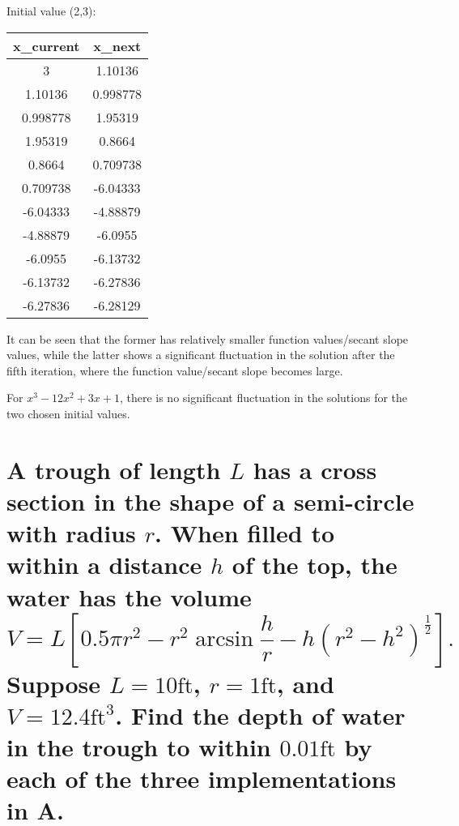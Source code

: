 \documentclass[a4paper]{article}
\begin{document}
\begin{center}
Initial value (2,3):\\
\begin{tabular}{|c|c|}
  \hline
  \textbf{x\_current} & \textbf{x\_next} \\
  \hline
  3 & 1.10136 \\
  \hline
  1.10136 & 0.998778 \\
  \hline
  0.998778 & 1.95319 \\
  \hline
  1.95319 & 0.8664 \\
  \hline
  0.8664 & 0.709738 \\
  \hline
  0.709738 & -6.04333 \\
  \hline
  -6.04333 & -4.88879 \\
  \hline
  -4.88879 & -6.0955 \\
  \hline
  -6.0955 & -6.13732 \\
  \hline
  -6.13732 & -6.27836 \\
  \hline
  -6.27836 & -6.28129 \\
  \hline
\end{tabular}
\end{center}
It can be seen that the former has relatively smaller function values/secant slope values, while the latter shows a significant fluctuation in the solution after the fifth iteration, where the function value/secant slope becomes large.

For $x^3 - 12x^2 + 3x + 1$, there is no significant fluctuation in the solutions for the two chosen initial values.


\section*{A trough of length $L$ has a cross section in the shape of a semi-circle with radius $r$. When filled to within a distance $h$ of the top, the water has the volume
\[
V = L\left[0.5\pi r^{2} - r^{2}\arcsin\frac{h}{r} - h\left(r^{2} - h^{2}\right)^{\frac{1}{2}}\right].
\]
Suppose $L = 10 \text{ft}$, $r = 1 \text{ft}$, and $V = 12.4 \text{ft}^3$. Find the depth of water in the trough to within $0.01 \text{ft}$ by each of the three implementations in A.}



\end{document}
